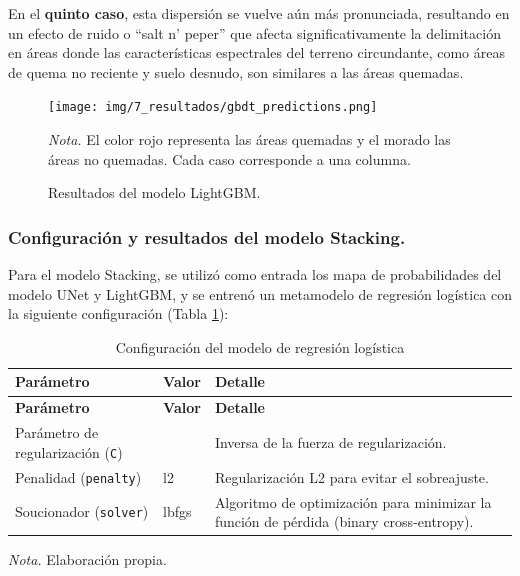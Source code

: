 En el \textbf{quinto caso}, esta dispersión se vuelve aún más pronunciada, resultando en un efecto de ruido o ``salt n' peper'' que afecta significativamente la delimitación en áreas donde las características 
espectrales del terreno circundante, como áreas de quema no reciente y suelo desnudo, son similares a las áreas quemadas.

\begin{figure}[H]
    \centering
    \caption{Resultados del modelo LightGBM.}
    \label{fig:lightgbm_resultados}
    \texttt{[image: img/7\_resultados/gbdt\_predictions.png]}
    \begin{flushleft}
        \vspace{-\baselineskip}
        \textit{Nota.} El color rojo representa las áreas quemadas y el morado las áreas no quemadas. Cada caso corresponde a una columna.
        \vspace{-\baselineskip}
    \end{flushleft}
\end{figure}

\subsubsection{Configuración y resultados del modelo Stacking.}

Para el modelo Stacking, se utilizó como entrada los mapa de probabilidades del modelo UNet y LightGBM, y se entrenó un metamodelo de regresión 
logística con la siguiente configuración (Tabla \ref{tab:config_logistic}):

\begin{longtable}{>{\raggedright\arraybackslash}p{5cm}>{\raggedright\arraybackslash}p{3cm}>{\raggedright\arraybackslash}p{7cm}}
    \caption{Configuración del modelo de regresión logística} \label{tab:config_logistic} \\
    \hline
    \textbf{Parámetro} & \textbf{Valor} & \textbf{Detalle} \\
    \hline
    \endfirsthead
    \hline
    \textbf{Parámetro} & \textbf{Valor} & \textbf{Detalle} \\
    \hline
    \endhead
    \hline
    \endfoot
    \hline
    \endlastfoot
    Parámetro de regularización (\texttt{C}) & 1.0 & Inversa de la fuerza de regularización. \\
    Penalidad (\texttt{penalty}) & l2 & Regularización L2 para evitar el sobreajuste. \\
    Soucionador (\texttt{solver}) & lbfgs & Algoritmo de optimización para minimizar la función de pérdida (binary cross-entropy). \\    
    \hline
\end{longtable}
\begin{flushleft}
    \vspace{-\baselineskip}
    \textit{Nota.} Elaboración propia.
\end{flushleft}

